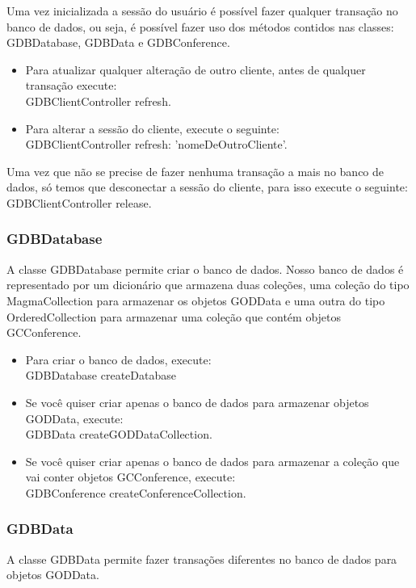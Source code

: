Uma vez inicializada a sessão do usuário é possível fazer qualquer transação no banco de dados, ou seja, é possível fazer uso dos métodos contidos nas classes: GDBDatabase, GDBData e GDBConference.


\begin{itemize}
\item Para atualizar qualquer alteração de outro cliente, antes de qualquer transação execute:\\
{GDBClientController refresh.}
\item Para alterar a sessão do cliente, execute o seguinte:\\
{GDBClientController refresh: 'nomeDeOutroCliente'.}
\end{itemize}

Uma vez que não se precise de fazer nenhuma transação a mais no banco de dados, só temos que desconectar a sessão do cliente, para isso execute o seguinte:\\
{GDBClientController release.}



\subsubsection{GDBDatabase}
A classe GDBDatabase permite criar o banco de dados. Nosso banco de dados é representado por um dicionário que armazena duas coleções, uma coleção do tipo MagmaCollection para armazenar os objetos GODData e uma outra do tipo OrderedCollection para armazenar uma coleção que contém objetos GCConference.\\

\begin{itemize}
\item Para criar o banco de dados, execute:\\
{GDBDatabase createDatabase}\\
\item Se você quiser criar apenas o banco de dados para armazenar objetos GODData, execute:\\
{GDBData createGODDataCollection.}\\
\item Se você quiser criar apenas o banco de dados para armazenar a coleção que vai conter objetos GCConference, execute:\\
{GDBConference createConferenceCollection.}
\end{itemize}

\subsubsection{GDBData}
A classe GDBData permite fazer transações diferentes no banco de dados para objetos GODData. 


